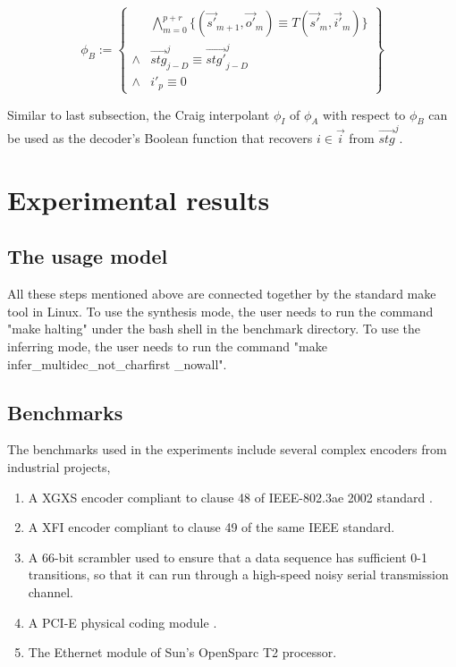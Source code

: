 \documentclass[runningheads,a4paper,orivec]{llncs}
\begin{document}
\begin{equation}
\phi_B:=
\left\{
\begin{array}{cc}
&\bigwedge_{m=0}^{p+r}
\{
(\vec{s'}_{m+1},\vec{o'}_m)\equiv T(\vec{s'}_m,\vec{i'}_m)
\}
\\
\wedge&\vec{stg}^j_{j-D}\equiv \vec{stg'}^j_{j-D} \\
\wedge& i'_{p}\equiv 0 
\end{array}
\right\}
\end{equation}

Similar to last subsection,
the Craig interpolant $\phi_I$ of $\phi_A$ with respect to $\phi_B$ 
can be used as the decoder's Boolean function that recovers $i\in\vec{i}$ from $\vec{stg}^j$.













\section{Experimental results}\label{sec_exp}
\subsection{The usage model}
All these steps mentioned above are connected together by the standard make tool in Linux.
To use the synthesis mode,
the user needs to run the command "make halting" under the bash shell in the benchmark directory.
To use the inferring mode,
the user needs to run the command "make infer\_multidec\_not\_charfirst \_nowall".

\subsection{Benchmarks}
The benchmarks used in the experiments include several complex encoders from industrial projects,
\begin{enumerate}
\item A XGXS encoder compliant to clause 48 of IEEE-802.3ae 2002 standard .
\item A XFI encoder compliant to clause 49 of the same IEEE standard.
\item A 66-bit scrambler used to ensure
that a data sequence has sufficient 0-1 transitions,
so that it can run through a high-speed
noisy serial transmission channel.
\item A PCI-E physical coding module .
\item The Ethernet module of Sun's OpenSparc T2 processor.
\end{enumerate}
\end{document}
